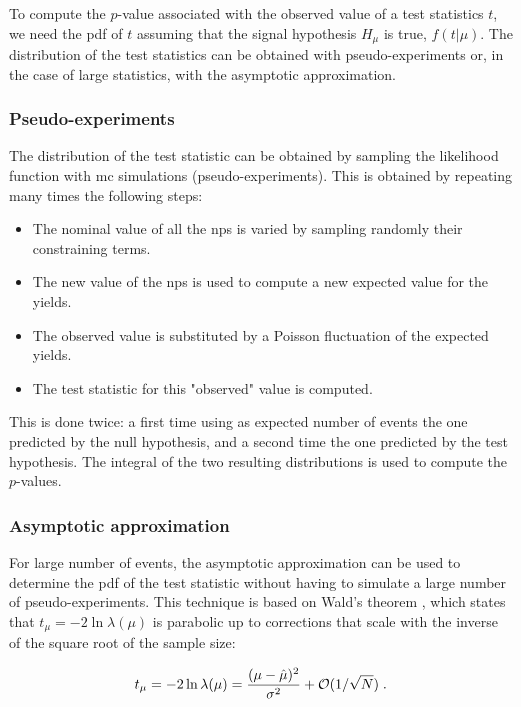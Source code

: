 To compute the $p$-value associated with the observed value of a test statistics $t$, we need the \gls{pdf} of $t$ assuming that the signal hypothesis $H_\mu$ is true, $ f(t | \mu ) $. The distribution of the test statistics can be obtained with pseudo-experiments or, in the case of large statistics, with the asymptotic approximation. 

\subsubsection*{Pseudo-experiments}

The distribution of the test statistic can be obtained by sampling the likelihood function with \gls{mc} simulations (pseudo-experiments). This is obtained by repeating many times the following steps:
\begin{itemize}
\item The nominal value of all the \glspl{np} is varied by sampling randomly their constraining terms.
\item The new value of the \glspl{np} is used to compute a new expected value for the yields.
\item The observed value is substituted by a Poisson fluctuation of the expected yields.
\item The test statistic for this "observed" value is computed.
\end{itemize}

This is done twice: a first time using as expected number of events the one predicted by the null hypothesis, and a second time the one predicted by the test hypothesis. The integral of the two resulting distributions is used to compute the $p$-values.

\subsubsection*{Asymptotic approximation}
For large number of events, the asymptotic approximation \cite{Cowan2011} can be used to determine the \gls{pdf} of the test statistic without having to simulate a large number of pseudo-experiments. This technique is based on  Wald's theorem \cite{Wald1943}, which states that $t_{\mu} = -2 \ln \lambda(\mu)$ is parabolic up to corrections that scale with the inverse of the square root of the sample size:

\begin{equation}
\label{eq:wald}
t_{\mu} = -2 \ln \lambda(\mu)
= \frac{(\mu - \hat{\mu})^2}{\sigma^2} + {\cal  O}(1/\sqrt{N}) \;.
\end{equation}

